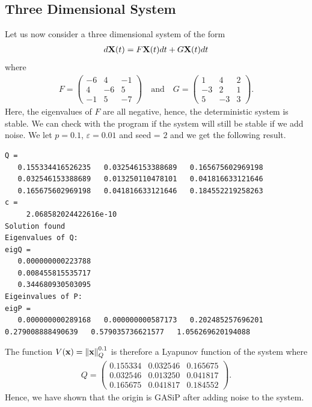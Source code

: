 \documentclass[a4paper,12pt,twoside,BCOR=10mm]{scrbook}
\begin{document}
\subsection{Three Dimensional System}\label{Kafli 3 dimensional system}
Let us now consider a three dimensional system of the form
\begin{align*}
    d\mathbf{X}(t) = F\mathbf{X}(t)dt + G\mathbf{X}(t)dt
\end{align*}
where
\begin{align*}
    F = \begin{pmatrix}
    -6 & 4 & -1\\
    4 & -6 & 5\\
    -1 & 5 & -7
    \end{pmatrix}
    \quad \text{and} \quad
    G = \begin{pmatrix}
    1 & 4 & 2\\
    -3 & 2 & 1\\
    5 & -3 & 3
    \end{pmatrix}.
\end{align*}
Here, the eigenvalues of $F$ are all negative, hence, the deterministic system is stable. We can check with the program if the system will still be stable if we add noise. We let $p = 0.1$, $\varepsilon = 0.01$ and seed = $2$ and we get the following result.
\begin{lstlisting}
Q =
   0.155334416526235   0.032546153388689   0.165675602969198
   0.032546153388689   0.013250110478101   0.041816633121646
   0.165675602969198   0.041816633121646   0.184552219258263
c =
     2.068582024422616e-10
Solution found
Eigenvalues of Q:
eigQ =
   0.000000000223788
   0.008455815535717
   0.344680930503095
Eigeinvalues of P:
eigP =
   0.000000000289168   0.000000000587173   0.202485257696201   0.279008888490639   0.579035736621577   1.056269620194088
\end{lstlisting}
The function $V(\mathbf{x}) = \left\lVert\mathbf{x}\right\rVert_{Q}^{0.1}$ is therefore a Lyapunov function of the system where
\begin{align*}
    Q = \begin{pmatrix}
    0.155334 & 0.032546 & 0.165675\\
    0.032546 & 0.013250 & 0.041817\\
    0.165675 & 0.041817 & 0.184552
    \end{pmatrix}.
\end{align*}
Hence, we have shown that the origin is GASiP after adding noise to the system.
\end{document}
